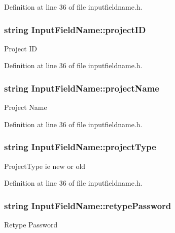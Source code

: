 Definition at line 36 of file inputfieldname.\-h.

\hypertarget{classInputFieldName_ac4bd117f3137956473f1a1d5ce9106a5}{
\subsubsection[{project\-I\-D}]{\setlength{\rightskip}{0pt plus 5cm}string Input\-Field\-Name\-::project\-I\-D}}\label{classInputFieldName_ac4bd117f3137956473f1a1d5ce9106a5}
Project I\-D 

Definition at line 36 of file inputfieldname.\-h.

\hypertarget{classInputFieldName_ab93b034743570810afe89aea88a7bbf6}{
\subsubsection[{project\-Name}]{\setlength{\rightskip}{0pt plus 5cm}string Input\-Field\-Name\-::project\-Name}}\label{classInputFieldName_ab93b034743570810afe89aea88a7bbf6}
Project Name 

Definition at line 36 of file inputfieldname.\-h.

\hypertarget{classInputFieldName_aaa398a603dfe98f4eca022ec9d90bc09}{
\subsubsection[{project\-Type}]{\setlength{\rightskip}{0pt plus 5cm}string Input\-Field\-Name\-::project\-Type}}\label{classInputFieldName_aaa398a603dfe98f4eca022ec9d90bc09}
Project\-Type ie new or old 

Definition at line 36 of file inputfieldname.\-h.

\hypertarget{classInputFieldName_acd50095ae8540a735bcd5787b904b06c}{
\subsubsection[{retype\-Password}]{\setlength{\rightskip}{0pt plus 5cm}string Input\-Field\-Name\-::retype\-Password}}\label{classInputFieldName_acd50095ae8540a735bcd5787b904b06c}
Retype Password 

